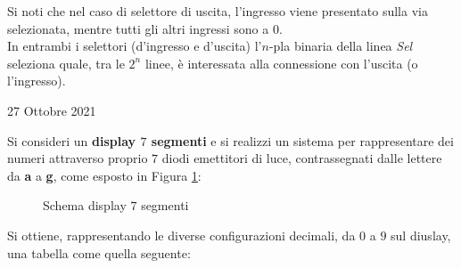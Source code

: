 \documentclass[a4paper]{extarticle}
\begin{document}
\noindent
Si noti che nel caso di selettore di uscita, l’ingresso viene presentato sulla via selezionata, mentre tutti gli altri ingressi sono a $0$.\\
In entrambi i selettori (d’ingresso e d’uscita) l’$n$-pla binaria della linea \emph{Sel} seleziona quale, tra le $2^n$ linee, è interessata alla connessione con l’uscita (o l’ingresso).

\newpage
\begin{center}
    27 Ottobre 2021
\end{center}
Si consideri un \textbf{display \(7\) segmenti} e si realizzi un sistema per rappresentare dei numeri attraverso proprio \(7\) diodi emettitori di luce, contrassegnati dalle lettere da \textbf{a} a \textbf{g}, come esposto in Figura \ref{fig:schema_display_7_segmenti}:

\begin{figure}[H]
  \centering
  \vspace{0.5em}
  \caption{Schema display $7$ segmenti}
  \label{fig:schema_display_7_segmenti}
\end{figure}

\noindent
Si ottiene, rappresentando le diverse configurazioni decimali, da $0$ a $9$ sul diuslay, una tabella come quella seguente:
\end{document}
